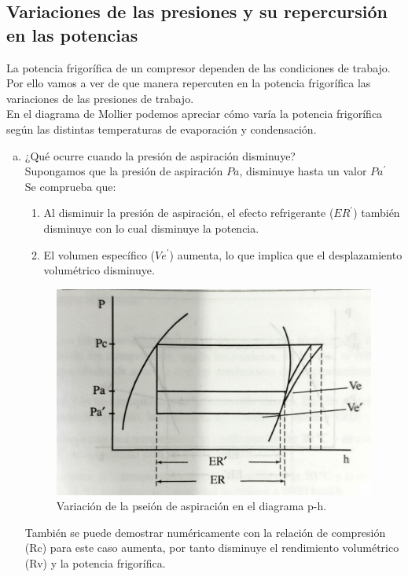 \subsection{Variaciones de las presiones y su repercursión en las potencias}

La potencia frigor\'ifica de un compresor dependen de las condiciones de trabajo. Por ello vamos a ver de que manera repercuten en la potencia frigor\'ifica las variaciones de las presiones de trabajo.\\ En el diagrama de Mollier podemos apreciar c\'omo var\'ia la potencia frigor\'ifica seg\'un las distintas temperaturas de evaporaci\'on y condensaci\'on.
\begin{enumerate}[a.]
	\item ¿Qu\'e ocurre cuando la presi\'on de aspiraci\'on disminuye?\\ Supongamos que la presi\'on de aspiraci\'on $Pa$, disminuye hasta un valor $Pa^\prime$\\Se comprueba que:
	\begin{enumerate}[1.]
		\item Al disminuir la presi\'on de aspiraci\'on, el efecto refrigerante ($ER^\prime$) tambi\'en disminuye con lo cual disminuye la potencia.
		\item El volumen espec\'ifico ($Ve^\prime$) aumenta, lo que implica que el desplazamiento volum\'etrico disminuye.
	\end{enumerate}

	\begin{figure}[H]
		\centering
		\includegraphics[width=.6\textwidth]{figuras/compresores/variacion de la presion de aspiracion.jpg}
		\caption{Variaci\'on de la psei\'on de aspiraci\'on en el diagrama p-h.}
		\label{Variaci\'on de la presi\'on de aspiraci\'on}
	\end{figure}
	Tambi\'en se puede demostrar num\'ericamente con la relaci\'on de compresi\'on (Rc) para este caso aumenta, por tanto disminuye el rendimiento volum\'etrico (Rv) y la potencia frigor\'ifica.


\end{enumerate}
